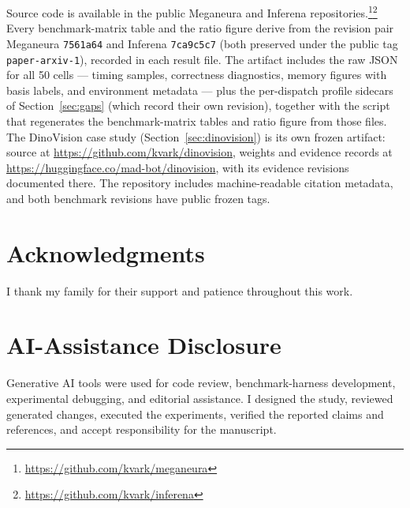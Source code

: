 \documentclass[10pt,twocolumn]{article}
\newcommand{\system}{Meganeura}
\newcommand{\inferena}{Inferena}
\newcommand{\code}[1]{\texttt{#1}}
\begin{document}
Source code is available in the public \system{} and \inferena{}
repositories.\footnote{\url{https://github.com/kvark/meganeura}}\footnote{
\url{https://github.com/kvark/inferena}} Every benchmark-matrix table and the
ratio figure derive from the revision pair \system{} \code{7561a64} and
\inferena{} \code{7ca9c5c7} (both preserved under the public tag
\code{paper-arxiv-1}), recorded in each result file. The artifact includes the
raw JSON for all 50 cells --- timing
samples, correctness diagnostics, memory figures with basis labels, and
environment metadata --- plus the per-dispatch profile sidecars of
Section~\ref{sec:gaps} (which record their own revision), together with the
script that regenerates the benchmark-matrix tables and ratio figure from
those files.
The DinoVision case study (Section~\ref{sec:dinovision}) is its own frozen
artifact: source at \url{https://github.com/kvark/dinovision}, weights and
evidence records at \url{https://huggingface.co/mad-bot/dinovision}, with
its evidence revisions documented there. The repository includes
machine-readable citation metadata, and both benchmark revisions have public
frozen tags.

\section*{Acknowledgments}

I thank my family for their support and patience throughout this work.

\section*{AI-Assistance Disclosure}

Generative AI tools were used for code review, benchmark-harness development,
experimental debugging, and editorial assistance. I designed the study,
reviewed generated changes, executed the experiments, verified the reported
claims and references, and accept responsibility for the manuscript.



\end{document}

